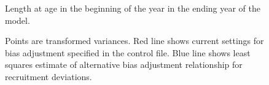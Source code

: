 \documentclass[
]{scrartcl}
\begin{document}
\begin{figure}


\caption{\label{fig-growth}Length at age in the beginning of the year in
the ending year of the model.}

\end{figure}%

\begin{figure}


\caption{\label{fig-biasadj}Points are transformed variances. Red line
shows current settings for bias adjustment specified in the control
file. Blue line shows least squares estimate of alternative bias
adjustment relationship for recruitment deviations.}

\end{figure}%
\end{document}
